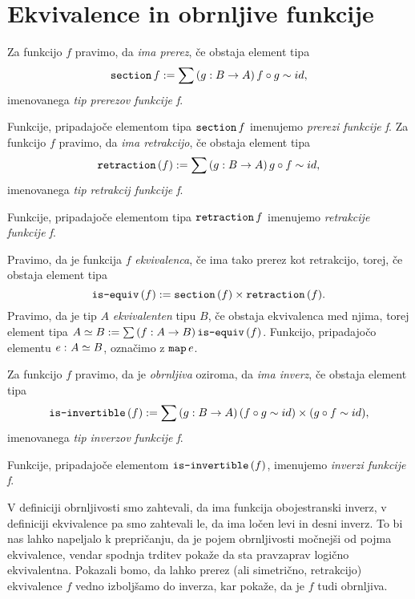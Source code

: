 \section{Ekvivalence in obrnljive funkcije}

\begin{definicija}
  Za funkcijo \(f\) pravimo, da \emph{ima prerez}, če obstaja element tipa
  \[\textnormal{\texttt{section}}\, f := \sum \left( g : B \to A \right) f \circ g \sim id,\]
  imenovanega \emph{tip prerezov funkcije f}.

  Funkcije, pripadajoče elementom tipa \(\textnormal{\texttt{section}}\, f\) imenujemo \emph{prerezi funkcije f}.
  Za funkcijo \(f\) pravimo, da \emph{ima retrakcijo}, če obstaja element tipa
  \[\textnormal{\texttt{retraction}}\,(f) := \sum \left( g : B \to A \right) g \circ f \sim id,\]
  imenovanega \emph{tip retrakcij funkcije f}.

  Funkcije, pripadajoče elementom tipa \(\textnormal{\texttt{retraction}}\, f\) imenujemo \emph{retrakcije funkcije f}.
\end{definicija}

\begin{definicija}
  Pravimo, da je funkcija \(f\) \emph{ekvivalenca}, če ima tako prerez kot retrakcijo,
  torej, če obstaja element tipa \[\textnormal{\texttt{is-equiv}}\,(f) := \textnormal{\texttt{section}}\,(f) \times \textnormal{\texttt{retraction}}\,(f).\]
  Pravimo, da je tip \(A\) \emph{ekvivalenten} tipu \(B\), če obstaja ekvivalenca med
  njima, torej element tipa \(A \simeq B := \sum \left( f : A \to B \right) \textnormal{\texttt{is-equiv}}\,(f)\). Funkcijo,
  pripadajočo elementu \(e \,\colon A \simeq B\), označimo z \(\textnormal{\texttt{map}}\, e\).
\end{definicija}

\begin{definicija}
  Za funkcijo \(f\) pravimo, da je \emph{obrnljiva} oziroma, da \emph{ima inverz},
  če obstaja element tipa
  \[\textnormal{\texttt{is-invertible}}\,(f) := \sum \left( g : B \to A \right) (f \circ g \sim id) \times (g \circ f \sim id),\]
  imenovanega \emph{tip inverzov funkcije f}.

  Funkcije, pripadajoče elementom \(\textnormal{\texttt{is-invertible}}\,(f)\), imenujemo \emph{inverzi funkcije f}.
\end{definicija}

V definiciji obrnljivosti smo zahtevali, da ima funkcija obojestranski inverz, v
definiciji ekvivalence pa smo zahtevali le, da ima ločen levi in desni inverz.
To bi nas lahko
napeljalo k prepričanju, da je pojem obrnljivosti močnejši od pojma ekvivalence, vendar
spodnja trditev pokaže da sta pravzaprav logično ekvivalentna. Pokazali bomo, da lahko
prerez (ali simetrično, retrakcijo) ekvivalence \(f\) vedno izboljšamo do inverza,
kar pokaže, da je \(f\) tudi obrnljiva.

